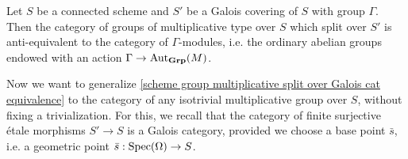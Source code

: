 \begin{proposition}\label{scheme group multiplicative split over Galois cat equivalence}
Let $S$ be a connected scheme and $S'$ be a Galois covering of $S$ with group $\Gamma$. Then the category of groups of multiplicative type over $S$ which split over $S'$ is anti-equivalent to the category of $\Gamma$-modules, i.e. the ordinary abelian groups endowed with an action $\Gamma\to\mathrm{Aut}_{\mathbf{Grp}}(M)$.
\end{proposition}

Now we want to generalize \cref{scheme group multiplicative split over Galois cat equivalence} to the category of any isotrivial multiplicative group over $S$, without fixing a trivialization. For this, we recall that the category of finite surjective \'etale morphisms $S'\to S$ is a Galois category, provided we choose a base point $\bar{s}$, i.e. a geometric point $\bar{s}:\mathrm{Spec}(\Omega)\to S$. 

